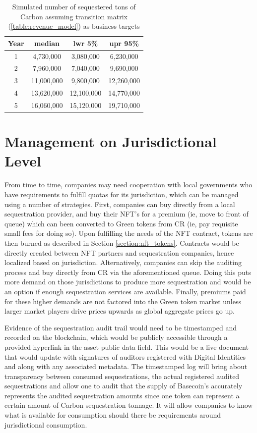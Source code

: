 \documentclass{article}
\begin{document}
\begin{table}[h]
\centering
\begin{tabular}{ |c|c|c|c| } 
\hline
 Year & median & lwr 5\% & upr 95\% \\
\hline
1 & 4,730,000 & 3,080,000 & 6,230,000 \\
2 & 7,960,000 & 7,040,000 & 9,690,000 \\
3 & 11,000,000 & 9,800,000 & 12,260,000 \\
4 & 13,620,000 & 12,100,000 & 14,770,000  \\
5 & 16,060,000 & 15,120,000 & 19,710,000 \\
\hline
\end{tabular}
\caption{Simulated number of sequestered tons of Carbon assuming transition matrix (\ref{table:revenue_model}) as business targets}
\label{table:pow_vs_pos}
\end{table}


\section{Management on Jurisdictional Level}

From time to time, companies may need cooperation with local governments who have requirements to fulfill quotas for its jurisdiction, which can be managed using a number of strategies. First, companies can buy directly from a local sequestration provider, and buy their NFT’s for a premium (ie, move to front of queue) which can been converted to Green tokens from CR (ie, pay requisite small fees for doing so). Upon fulfilling the needs of the NFT contract, tokens are then burned as described in Section \ref{section:nft_tokens}. Contracts would be directly created between NFT partners and sequestration companies, hence localized based on jurisdiction. Alternatively, companies can skip the auditing process and buy directly from CR via the aforementioned queue. Doing this puts more demand on those jurisdictions to produce more sequestration and would be an option if enough sequestration services are available. Finally, premiums paid for these higher demands are not factored into the Green token market unless larger market players drive prices upwards as global aggregate prices go up.

Evidence of the sequestration audit trail would need to be timestamped and recorded on the blockchain, which would be publicly accessible through a provided hyperlink in the asset public data field. This would be a live document that would update with signatures of auditors registered with Digital Identities and along with any associated metadata. The timestamped log will bring about transparency between consumed sequestrations, the actual registered audited sequestrations and allow one to audit that the supply of Basecoin’s accurately represents the audited sequestration amounts since one token can represent a certain amount of Carbon sequestration tonnage. It will allow companies to know what is available for consumption should there be requirements around jurisdictional consumption.
\end{document}
